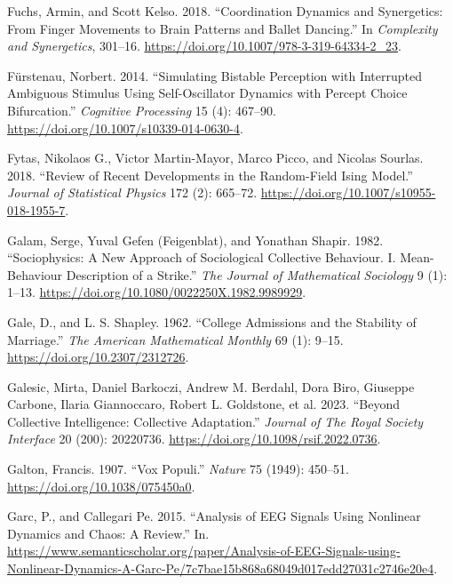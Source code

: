 \documentclass[
  a4paper,
  DIV=11,
  numbers=noendperiod,
  oneside]{scrreprt}
\newlength{\cslhangindent}
\newlength{\cslentryspacingunit} %
\newenvironment{CSLReferences}[2] %
 {%
  \setlength{\parindent}{0pt}
  \ifodd #1
  \let\oldpar\par
  \def\par{\hangindent=\cslhangindent\oldpar}
  \fi
  \setlength{\parskip}{#2\cslentryspacingunit}
 }%
 {}
\begin{document}
\begin{CSLReferences}{1}{0}
\leavevmode{}%
Fuchs, Armin, and Scott Kelso. 2018. {``Coordination {Dynamics} and
{Synergetics}: {From Finger Movements} to {Brain Patterns} and {Ballet
Dancing}.''} In \emph{Complexity and {Synergetics}}, 301--16.
\url{https://doi.org/10.1007/978-3-319-64334-2_23}.

\leavevmode{}%
Fürstenau, Norbert. 2014. {``Simulating Bistable Perception with
Interrupted Ambiguous Stimulus Using Self-Oscillator Dynamics with
Percept Choice Bifurcation.''} \emph{Cognitive Processing} 15 (4):
467--90. \url{https://doi.org/10.1007/s10339-014-0630-4}.

\leavevmode{}%
Fytas, Nikolaos G., Victor Martin-Mayor, Marco Picco, and Nicolas
Sourlas. 2018. {``Review of Recent Developments in the Random-Field
{Ising} Model.''} \emph{Journal of Statistical Physics} 172 (2):
665--72. \url{https://doi.org/10.1007/s10955-018-1955-7}.

\leavevmode{}%
Galam, Serge, Yuval Gefen (Feigenblat), and Yonathan Shapir. 1982.
{``Sociophysics: {A} New Approach of Sociological Collective Behaviour.
{I}. Mean-Behaviour Description of a Strike.''} \emph{The Journal of
Mathematical Sociology} 9 (1): 1--13.
\url{https://doi.org/10.1080/0022250X.1982.9989929}.

\leavevmode{}%
Gale, D., and L. S. Shapley. 1962. {``College {Admissions} and the
{Stability} of {Marriage}.''} \emph{The American Mathematical Monthly}
69 (1): 9--15. \url{https://doi.org/10.2307/2312726}.

\leavevmode{}%
Galesic, Mirta, Daniel Barkoczi, Andrew M. Berdahl, Dora Biro, Giuseppe
Carbone, Ilaria Giannoccaro, Robert L. Goldstone, et al. 2023. {``Beyond
Collective Intelligence: {Collective} Adaptation.''} \emph{Journal of
The Royal Society Interface} 20 (200): 20220736.
\url{https://doi.org/10.1098/rsif.2022.0736}.

\leavevmode{}%
Galton, Francis. 1907. {``Vox Populi.''} \emph{Nature} 75 (1949):
450--51. \url{https://doi.org/10.1038/075450a0}.

\leavevmode{}%
Garc, P., and Callegari Pe. 2015. {``Analysis of EEG Signals Using
Nonlinear Dynamics and Chaos: A Review.''} In.
\url{https://www.semanticscholar.org/paper/Analysis-of-EEG-Signals-using-Nonlinear-Dynamics-A-Garc-Pe/7c7bae15b868a68049d017edd27031c2746e20e4}.


\end{CSLReferences}
\end{document}
